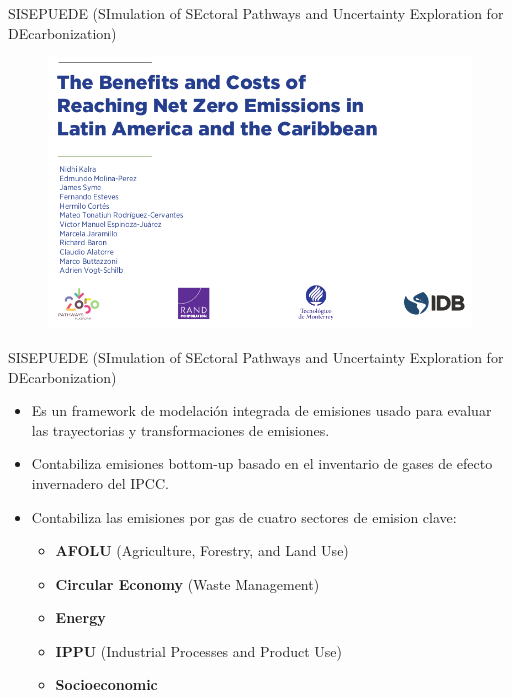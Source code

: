 \documentclass[11pt]{beamer}
\begin{document}
\begin{frame}{SISEPUEDE (SImulation of SEctoral Pathways and Uncertainty Exploration for DEcarbonization)}

\begin{figure}
	\includegraphics[scale=0.5]{images/net_zero}
\end{figure}
\end{frame}

\begin{frame}{SISEPUEDE (SImulation of SEctoral Pathways and Uncertainty Exploration for DEcarbonization)}

\begin{itemize}
	\item Es un framework de modelación integrada de emisiones usado para evaluar las trayectorias y transformaciones de emisiones.
	\item Contabiliza emisiones bottom-up basado en el inventario de gases de efecto invernadero del IPCC.
	\item Contabiliza las emisiones por gas de cuatro sectores de emision clave:
		\begin{itemize}
			\item \textbf{AFOLU} (Agriculture, Forestry, and Land Use) 
			\item \textbf{Circular Economy} (Waste Management) 
			\item \textbf{Energy} 
			\item \textbf{IPPU} (Industrial Processes and Product Use)
			\item \textbf{Socioeconomic}
		\end{itemize}
\end{itemize}
\end{frame}
\end{document}

